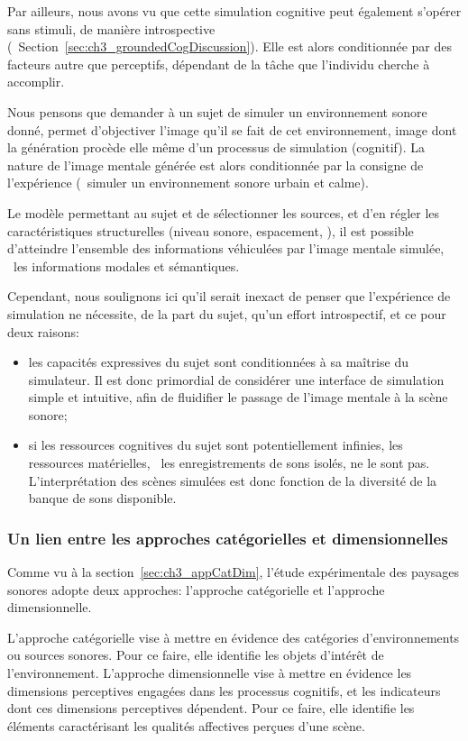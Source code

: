 Par ailleurs, nous avons vu que cette simulation cognitive peut également s'opérer sans stimuli, de manière introspective (\cf~Section~\ref{sec:ch3_groundedCogDiscussion}). Elle est alors conditionnée par des facteurs autre que perceptifs, dépendant de la tâche que l'individu cherche à accomplir.

Nous pensons que demander à un sujet de simuler un environnement sonore donné, permet d'objectiver l'image qu'il se fait de cet environnement, image dont la génération procède elle même d'un processus de simulation (cognitif). La nature de l'image mentale générée est alors conditionnée par la consigne de l'expérience (\eg~simuler un environnement sonore urbain et calme).

Le modèle permettant au sujet et de sélectionner les sources, et d'en régler les caractéristiques structurelles (niveau sonore, espacement, \etc), il est possible d'atteindre l'ensemble des informations véhiculées par l'image mentale simulée, \ie~les informations modales et sémantiques.

Cependant, nous soulignons ici qu'il serait inexact de penser que l'expérience de simulation ne nécessite, de la part du sujet, qu'un effort introspectif, et ce pour deux raisons:

\begin{itemize}
\item les capacités expressives du sujet sont conditionnées à sa maîtrise du simulateur. Il est donc primordial de considérer une interface de simulation simple et intuitive, afin de fluidifier le passage de l'image mentale à la scène sonore;
\item si les ressources cognitives du sujet sont potentiellement infinies, les ressources matérielles, \ie~les enregistrements de sons isolés, ne le sont pas. L'interprétation des scènes simulées est donc fonction de la diversité de la banque de sons disponible. 
\end{itemize}

\subsubsection{Un lien entre les approches catégorielles et dimensionnelles}

Comme vu à la section~\ref{sec:ch3_appCatDim}, l'étude expérimentale des paysages sonores adopte deux approches: l'approche catégorielle et l'approche dimensionnelle.

L'approche catégorielle vise à mettre en évidence des catégories d'environnements ou sources sonores. Pour ce faire, elle identifie les objets d'intérêt de l'environnement. L'approche dimensionnelle vise à mettre en évidence les dimensions perceptives engagées dans les processus cognitifs, et les indicateurs dont ces dimensions perceptives dépendent. Pour ce faire, elle identifie les éléments caractérisant les qualités affectives perçues d'une scène.


